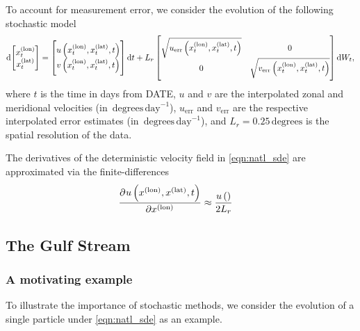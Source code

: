 To account for measurement error, we consider the evolution of the following stochastic model
\begin{equation}
	\sde{\begin{bmatrix}
			x^{(\mathrm{lon})}_t \\ x^{(\mathrm{lat})}_t
		\end{bmatrix}}{\begin{bmatrix} u\left(x^{(\mathrm{lon})}_t, x^{(\mathrm{lat})}_t, t\right) \\ v\left(x^{(\mathrm{lon})}_t, x^{(\mathrm{lat})}_t, t\right) \end{bmatrix}}{L_r\begin{bmatrix}
			\sqrt{u_{\mathrm{err}}\left(x^{(\mathrm{lon})}_t, x^{(\mathrm{lat})}_t, t\right)} & 0                                                                                 \\
			0                                                                                 & \sqrt{v_{\mathrm{err}}\left(x^{(\mathrm{lon})}_t, x^{(\mathrm{lat})}_t, t\right)}
		\end{bmatrix}},
	\label{eqn:natl_sde}
\end{equation}
where \(t\) is the time in days from DATE, \(u\) and \(v\) are the interpolated zonal and meridional velocities (in \(\mathrm{\,degrees\,day}^{-1}\)), \(u_{\mathrm{err}}\) and \(v_{\mathrm{err}}\) are the respective interpolated error estimates (in \(\mathrm{\,degrees\,day}^{-1}\)), and \(L_r = 0.25 \mathrm{\,degrees}\) is the spatial resolution of the data.



The derivatives of the deterministic velocity field in \eqref{eqn:natl_sde} are approximated via the finite-differences
\begin{align*}
	\dpd{u\left({x^{(\text{lon})}}, {x^{(\text{lat})}}, t\right)}{{x^{(\text{lon})}}} & \approx \frac{u\left(\right)}{2 L_r}
\end{align*}


\subsection{The Gulf Stream}


\subsubsection{A motivating example}
To illustrate the importance of stochastic methods, we consider the evolution of a single particle under \eqref{eqn:natl_sde} as an example.

